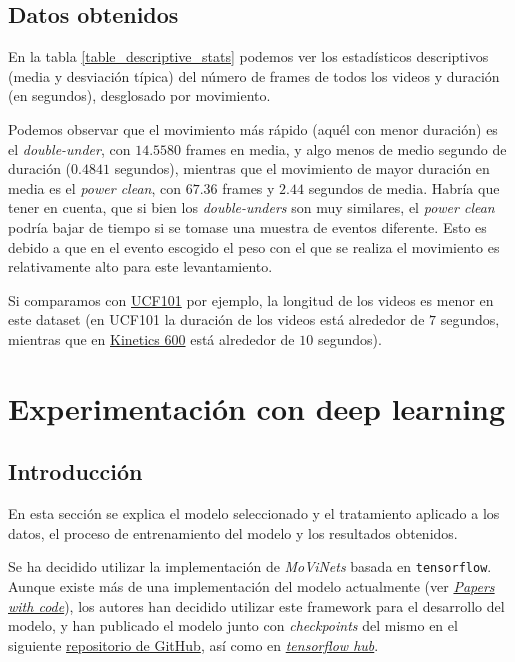 \subsection{Datos obtenidos}

En la tabla \ref{table_descriptive_stats} podemos ver los estadísticos descriptivos (media y desviación típica) del número de frames de todos los videos y duración (en segundos), desglosado por movimiento.



Podemos observar que el movimiento más rápido (aquél con menor duración) es el \textit{double-under}, con $14.5580$ frames en media, y algo menos de medio segundo de duración ($0.4841$ segundos), mientras que el movimiento de mayor duración en media es el \textit{power clean}, con $67.36$ frames y $2.44$ segundos de media. Habría que tener en cuenta, que si bien los \textit{double-unders} son muy similares, el \textit{power clean} podría bajar de tiempo si se tomase una muestra de eventos diferente. Esto es debido a que en el evento escogido el peso con el que se realiza el movimiento es relativamente alto para este levantamiento.

Si comparamos con \href{https://www.crcv.ucf.edu/data/UCF101.php}{UCF101} por ejemplo, la longitud de los videos es menor en este dataset (en UCF101 la duración de los videos está alrededor de $7$ segundos, mientras que en \href{https://www.deepmind.com/open-source/kinetics}{Kinetics 600} está alrededor de $10$ segundos).


\section{Experimentación con deep learning}\label{deep_learning}

\subsection{Introducción}

En esta sección se explica el modelo seleccionado y el tratamiento aplicado a los datos, el proceso de entrenamiento del modelo y los resultados obtenidos.

Se ha decidido utilizar la implementación de \textit{MoViNets} basada en  \texttt{tensorflow}. Aunque existe más de una implementación del modelo actualmente (ver \href{https://paperswithcode.com/paper/movinets-mobile-video-networks-for-efficient}{\textit{Papers with code}}), los autores han decidido utilizar este framework para el desarrollo del modelo, y han publicado el modelo junto con \textit{checkpoints} del mismo en el siguiente \href{https://github.com/tensorflow/models/tree/master/official/projects/movinet}{repositorio de GitHub}, así como en \href{https://tfhub.dev/google/collections/movinet/1}{\textit{tensorflow hub}}.

